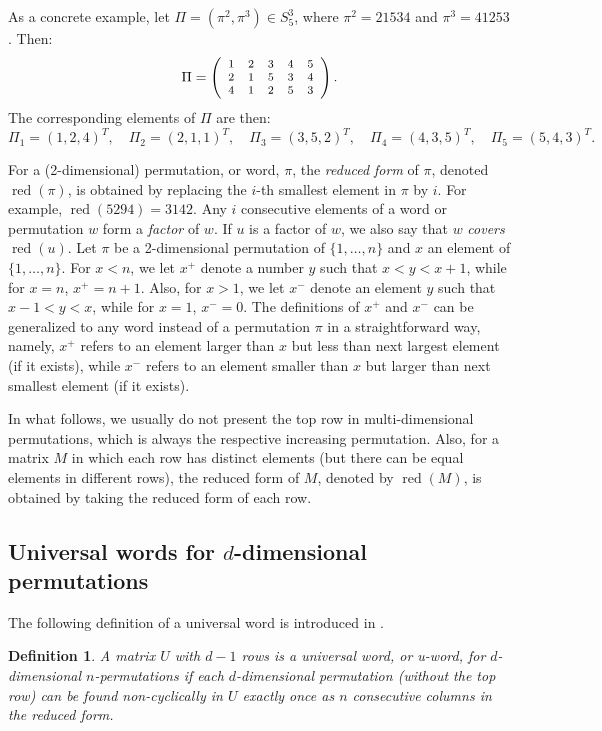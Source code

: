 \documentclass[12pt]{article}
\newtheorem{deff}[thm]{Definition}
\DeclareMathOperator{\red}{red}
\begin{document}
As a concrete example, let \( \Pi = (\pi^2, \pi^3) \in S^3_5 \), where \( \pi^2 = 21534 \) and \( \pi^3 = 41253 \). Then:
\renewcommand{\arraystretch}{1}
\[
{\footnotesize \Pi = \left(
\begin{array}{ccccc}
1 & 2 & 3 & 4 & 5 \\
2 & 1 & 5 & 3 & 4 \\
4 & 1 & 2 & 5 & 3
\end{array}
\right).}
\]
The corresponding elements of \( \Pi \) are then:  
\[
\Pi_1 = (1,2,4)^T, \quad \Pi_2 = (2,1,1)^T, \quad \Pi_3 = (3,5,2)^T, \quad \Pi_4 = (4,3,5)^T, \quad \Pi_5 = (5,4,3)^T.
\]

For a (2-dimensional) permutation, or word, $\pi$, the {\em reduced form} of $\pi$, denoted $\red(\pi)$, is obtained by replacing the $i$-th smallest element in $\pi$ by $i$. For example, $\red(5294)=3142$. Any $i$ consecutive elements of a word or permutation $w$ form a {\em factor} of $w$. If $u$ is a factor of $w$, we also say that $w$ {\em covers} $\red(u)$. Let $\pi$ be a 2-dimensional permutation of $\{1,\ldots,n\}$ and $x$ an element of $\{1,\ldots,n\}$. For $x<n$, we let $x^+$ denote a number $y$ such that $x<y<x+1$, while for $x=n$, $x^+=n+1$. Also, for $x>1$, we let $x^-$ denote an element $y$ such that $x-1<y<x$, while for $x=1$, $x^-=0$. The definitions of $x^+$ and $x^-$ can be generalized to any word instead of a permutation $\pi$ in a straightforward way, namely, $x^+$ refers to an element larger than $x$ but less than next largest element (if it exists), while $x^-$ refers to an element smaller than $x$ but larger than next smallest element (if it exists).   


In what follows, we usually do not present the top row in multi-dimensional permutations, which is always the respective increasing permutation. Also, for a matrix $M$ in which each row has distinct elements (but there can be equal elements in different rows), the reduced form of $M$, denoted by $\red(M)$, is obtained by taking the reduced form of each row.  

\subsection{Universal words for $d$-dimensional permutations}

The following definition of a universal word is introduced in \cite{KQ}.

\begin{deff}\label{u-word-def} A matrix $U$ with $d-1$ rows is a {\em universal word}, or {\em u-word}, for $d$-dimensional $n$-permutations if {\em each} $d$-dimensional permutation (without the top row) can be found non-cyclically in $U$ {\em exactly once} as $n$ consecutive columns in the reduced form.
\end{deff}
\end{document}
